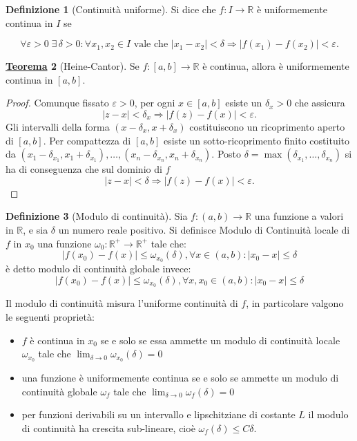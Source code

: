\documentclass[a4paper,twoside]{article}
\renewcommand{\epsilon}{\varepsilon}
\newcommand{\R}{\mathbb{R}}
\theoremstyle{definition}
\newtheorem{theorem}{\color{Red}\underline{\textrm Teorema}}
\newtheorem{definizione}[theorem]{Definizione}
\numberwithin{theorem}{section}
\begin{document}
\begin{definizione}[Continuità uniforme]
Si dice che $f:I\to\R$ è uniformemente continua in $I$ se 


$$\forall\epsilon>0\; \exists\,\delta>0: \forall x_1,x_2\in I\text{ vale che } |x_1-x_2|<\delta \Rightarrow |f(x_1)-f(x_2)|<\epsilon.$$
\end{definizione}

\begin{theorem}[Heine-Cantor]
Se $f:[a,b]\to\R$ è continua, allora è uniformemente continua in $[a,b]$.
\end{theorem}
\begin{proof}
Comunque fissato $\epsilon > 0$, per ogni $x\in[a,b]$ esiste un $\delta_x > 0$ che assicura $$|z-x|<\delta_x\Longrightarrow|f(z)-f(x)|<\epsilon.$$
Gli intervalli della forma $(x-\delta_x, x+\delta_x)$ costituiscono un ricoprimento aperto di $[a,b]$. Per compattezza di $[a,b]$ esiste un sotto-ricoprimento finito costituito da $(x_1-\delta_{x_1},x_1+\delta_{x_1}),\ldots,(x_n-\delta_{x_n},x_n+\delta_{x_n})$. Posto $\delta=\max(\delta_{x_1},\ldots,\delta_{x_n})$ si ha di conseguenza che sul dominio di $f$
$$|z-x|<\delta\Longrightarrow|f(z)-f(x)|<\epsilon.$$
\end{proof}


\begin{definizione}[Modulo di continuità]
Sia $f:(a,b)\to\R$ una funzione a valori in $\R$, e sia $\delta$ un numero reale positivo. Si definisce Modulo di Continuità locale di $f$ in $x_0$ una funzione $\omega_0:\R^+\to\R^+$  tale che:\\
$$|f(x_0)-f(x)|\leq\omega_{x_0}(\delta),\forall x\in(a,b):|x_0-x|\leq\delta$$ è detto modulo di continuità globale invece:
$$|f(x_0)-f(x)|\leq\omega_{x_0}(\delta),\forall x,x_0\in(a,b):|x_0-x|\leq\delta$$
\end{definizione}



Il modulo di continuità misura l'uniforme continuità di $f$, in particolare valgono le seguenti proprietà:
\begin{itemize}
 \item $f$ è continua in $x_0$ se e solo se essa ammette un modulo di continuità locale $\omega_{x_0}$ tale che $\lim_{\delta\to0}\omega_{x_0}(\delta)=0$
 \item una funzione è uniformemente continua se e solo se ammette un modulo di continuità globale $\omega_f$ tale che $\lim_{\delta\to 0}\omega_f(\delta)=0$
 \item per funzioni derivabili su un intervallo e lipschitziane di costante $L$ il modulo di continuità ha crescita sub-lineare, cioè $\omega_f(\delta)\leq C\delta$.
\end{itemize}
\end{document}
